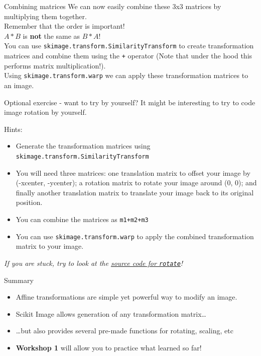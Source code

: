\documentclass[9pt, aspectratio=169]{beamer}
\begin{document}
\begin{frame}
    {Combining matrices}
    We can now easily combine these 3x3 matrices by multiplying them together.\\
    Remember that the order is important!\\

    $A * B$ is \textbf{not} the same as $B * A$!\\

    You can use \texttt{skimage.transform.SimilarityTransform} to create transformation matrices and combine them using the \texttt{+} operator (Note that under the hood this performs matrix multiplication!). \\
    
    Using \texttt{skimage.transform.warp} we can apply these transformation matrices to an image.
\end{frame}

\begin{frame}
    {Optional exercise - want to try by yourself?}
    It might be interesting to try to code image rotation by yourself.

    Hints:

    \begin{itemize}
        \item Generate the transformation matrices using \texttt{skimage.transform.SimilarityTransform}
        \item You will need three matrices: one translation matrix to offset your image by (-xcenter, -ycenter); a rotation matrix to rotate your image around (0, 0); and finally another translation matrix to translate your image back to its original position.
        \item You can combine the matrices as \texttt{m1+m2+m3}
        \item You can use \texttt{skimage.transform.warp} to apply the combined transformation matrix to your image.
    \end{itemize}

    \textit{If you are stuck, try to look at the \href{https://github.com/scikit-image/scikit-image/blob/main/skimage/transform/\_warps.py\#L349-L460}{\underline{source code for \texttt{rotate}}}!}
\end{frame}

\begin{frame}
    {Summary}
    \begin{itemize}
        \item Affine transformations are simple yet powerful way to modify an image.
        \item Scikit Image allows generation of any transformation matrix\dots
        \item \dots but also provides several pre-made functions for rotating, scaling, etc
        \item \textbf{Workshop 1} will allow you to practice what learned so far!
    \end{itemize}

\end{frame}
\end{document}
